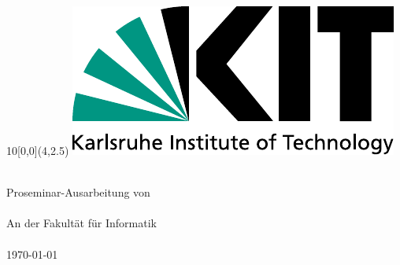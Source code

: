 
\newcommand{\diameter}{20}
\newcommand{\xone}{-15}
\newcommand{\xtwo}{160}
\newcommand{\yone}{15}
\newcommand{\ytwo}{-253}

\begin{titlepage}

\begin{textblock}{10}[0,0](4,2.5)
	\includegraphics[width=.3\textwidth]{images/KITLogo_RGB.pdf}
\end{textblock}
\vspace*{3.5cm}
\begin{center}
	\Huge{\mytitle}
	\vspace*{2cm}\\
	\Large{
		Proseminar-Ausarbeitung von
	}\\
	\vspace*{1cm}
	\huge{\myname}\\
	\vspace*{1cm}
	\Large{
		An der Fakultät für Informatik
		\\
		\myinstitute
	}\\
	\vspace*{1cm}
	\Large{\today}
\end{center}
\vspace*{1cm}



\end{titlepage}
